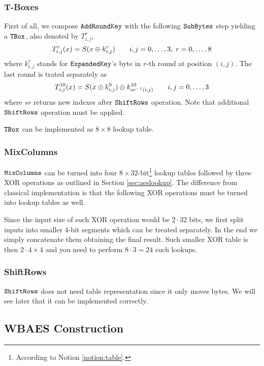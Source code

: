 \subsubsection{T-Boxes}
	
	First of all, we compose $\texttt{AddRoundKey}$ with the following $\texttt{SubBytes}$ step yielding a $\texttt{TBox}$, also denoted by $T_{i,j}^r$,
	\begin{equation}
		T_{i,j}^r(x) = S(x\oplus k_{i,j}^r) \qquad i,j=0 , \ldots , 3,\;r=0 , \ldots , 8
	\end{equation}
	where $k_{i,j}^r$ stands for $\texttt{ExpandedKey}$'s byte in $r$-th round at position $(i,j)$. The last round is trated separately as
	\begin{equation}
		T_{i,j}^{10}(x) = S(x\oplus k_{i,j}^9) \oplus k_{sr^{-1}(i,j)}^{10} \qquad i,j=0 , \ldots , 3
	\end{equation}
	where $sr$ returns new indexes after $\texttt{ShiftRows}$ operation. Note that additional $\texttt{ShiftRows}$ operation must be applied.
	
	$\texttt{TBox}$ can be implemented as $8\times 8$ lookup table.

\subsubsection{MixColumns}
	
	$\texttt{MixColumns}$ can be turned into four $8\times 32$-bit\footnote{According to Notion \ref{notion:table}.} lookup tables followed by three XOR operations as outlined in Section \ref{sec:aeslookup}. The difference from classical implementation is that the following XOR operations must be turned into lookup tables as well.
	
	Since the input size of such XOR operation would be $2\cdot 32$ bits, we first split inputs into smaller $4$-bit segments which can be treated separately. In the end we simply concatenate them obtaining the final result. Such smaller XOR table is then $2\cdot 4\times 4$ and you need to perform $8\cdot 3=24$ such lookups.

\subsubsection{ShiftRows}
	
	$\texttt{ShiftRows}$ does not need table representation since it only moves bytes. We will see later that it can be implemented correctly.

\subsection{WBAES Construction}

